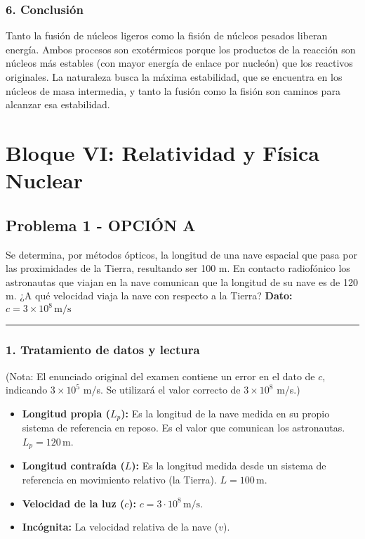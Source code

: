 \subsubsection*{6. Conclusión}
\begin{cajaconclusion}
Tanto la fusión de núcleos ligeros como la fisión de núcleos pesados liberan energía. Ambos procesos son exotérmicos porque los productos de la reacción son núcleos más estables (con mayor energía de enlace por nucleón) que los reactivos originales. La naturaleza busca la máxima estabilidad, que se encuentra en los núcleos de masa intermedia, y tanto la fusión como la fisión son caminos para alcanzar esa estabilidad.
\end{cajaconclusion}

\newpage

\section{Bloque VI: Relatividad y Física Nuclear}
\label{sec:relatividad_nuclear_2001_jun_ord}

\subsection{Problema 1 - OPCIÓN A}
\label{subsec:6A_2001_jun_ord}

\begin{cajaenunciado}
Se determina, por métodos ópticos, la longitud de una nave espacial que pasa por las proximidades de la Tierra, resultando ser 100 m. En contacto radiofónico los astronautas que viajan en la nave comunican que la longitud de su nave es de 120 m. ¿A qué velocidad viaja la nave con respecto a la Tierra?
\textbf{Dato:} $c=3\times10^{8}\,\text{m/s}$
\end{cajaenunciado}
\hrule

\subsubsection*{1. Tratamiento de datos y lectura}
(Nota: El enunciado original del examen contiene un error en el dato de $c$, indicando $3\times10^5$ m/s. Se utilizará el valor correcto de $3\times10^8$ m/s.)
\begin{itemize}
    \item \textbf{Longitud propia ($L_p$):} Es la longitud de la nave medida en su propio sistema de referencia en reposo. Es el valor que comunican los astronautas. $L_p = 120 \, \text{m}$.
    \item \textbf{Longitud contraída ($L$):} Es la longitud medida desde un sistema de referencia en movimiento relativo (la Tierra). $L = 100 \, \text{m}$.
    \item \textbf{Velocidad de la luz ($c$):} $c = 3 \cdot 10^8 \, \text{m/s}$.
    \item \textbf{Incógnita:} La velocidad relativa de la nave ($v$).
\end{itemize}


